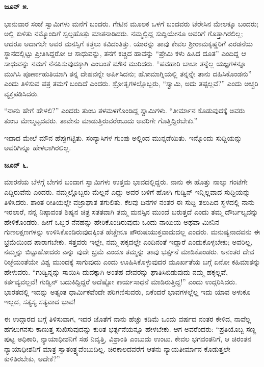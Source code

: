 \textbf{ಜೂನ್ ೫.}

ಭಾನುವಾರ ಸಂಜೆ ಸ್ವಾಮಿಗಳು ಮನೆಗೆ ಬಂದರು. ಗೇಟಿನ ಮೂಲಕ ಒಳಗೆ ಬಂದವರು ಟೆರೇಸಿನ ಮೇಲಕ್ಕೂ ಬಂದರು; ಅಲ್ಲಿ ಕುಳಿತು ನಮ್ಮೊಂದಿಗೆ ಸ್ವಲ್ಪಹೊತ್ತು ಮಾತನಾಡಿದರು. ನಮ್ಮಲ್ಲಿದ್ದ ಸುದ್ದಿಯೇನೂ ಅವರಿಗೆ ಗೊತ್ತಾಗಿರಲಿಲ್ಲ; ಆದರೂ ಅದಾಗಲೇ ಅವರ ಮನಸ್ಸಿಗೆ ಕತ್ತಲು ಕವಿದಂತಿತ್ತು. ಯಾರನ್ನು ತಾವು ಕೇವಲ ಶ‍್ರೀರಾಮಕೃಷ್ಣರಿಗೆ ಎರಡನೆಯ ಸ್ಥಾನದಲ್ಲಿಟ್ಟು ಪ್ರೀತಿಸಿದ್ದರೋ ಆ ಸಾಧುವನ್ನು, ತನಗೆ ಕಚ್ಚಿದ ಹಾವನ್ನು “ಪ್ರೇಮಿ ಕಳು ಹಿಸಿದ ದೂತ” ಎಂದಿದ್ದ ಆ ಸಾಧುವನ್ನು ನಮಗೆ ನೆನಪಿಸುವುದಕ್ಕಾಗಿ ಎಂಬಂತೆ ಮೌನ ಮುರಿದರು. “ಪವಹಾರಿ ಬಾಬಾ ತನ್ನೆಲ್ಲ ಯಜ್ಞಗಳನ್ನೂ ಮುಗಿಸಿ ಪೂರ್ಣಾಹುತಿಯಾಗಿ ತನ್ನ ದೇಹವನ್ನೇ ಅರ್ಪಿಸಿದನು; ಹೋಮಾಗ್ನಿಯಲ್ಲಿ ತನ್ನನ್ನೇ ತಾನು ದಹಿಸಿಕೊಂಡನು” ಎಂದು ತಿಳಿಸುವ ಪತ್ರ ತಮಗೆ ಬಂದಿದೆ ಎಂದರು. ಶ್ರೋತೃಗಳಲ್ಲೊಬ್ಬರು, “ಸ್ವಾಮಿ, ಅದು ತಪ್ಪಲ್ಲವೆ?” ಎಂದು ಅಚ್ಚರಿ ವ್ಯಕ್ತಪಡಿಸಿದರು.

“ನಾನು ಹೇಗೆ ಹೇಳಲಿ?” ಎಂದರು ತುಂಬ ತಳಮಳಗೊಂಡಿದ್ದ ಸ್ವಾಮಿಗಳು. “ತೀರ್ಮಾನ ಕೊಡುವುದಕ್ಕೆ ಅವರು ತುಂಬ ಮೇಲ್ಮಟ್ಟದವರು. ತಾವೇನು ಮಾಡುತ್ತಿರುವರೆಂಬುದು ಅವರಿಗೇ ಗೊತ್ತಿದ್ದಿರಬೇಕು.”

ಇದಾದ ಮೇಲೆ ಮೌನ ಹೆಪ್ಪುಗಟ್ಟಿತು. ಸಂನ್ಯಾಸಿಗಳ ಗುಂಪು ಅಲ್ಲಿಂದ ಮುನ್ನಡೆಯಿತು. ಇನ್ನೊಂದು ಸುದ್ದಿಯನ್ನು ಅವರಿಗಿನ್ನೂ ಹೇಳಲಾಗಿರಲಿಲ್ಲ.

\textbf{ಜೂನ್ ೬.}

ಮಾರನೆಯ ಬೆಳಗ್ಗೆ ಬೇಗನೆ ಬಂದಾಗ ಸ್ವಾಮಿಗಳು ಉತ್ತಮ ಭಾವದಲ್ಲಿದ್ದರು. ನಾನು ಈ ಹೊತ್ತು ನಾಲ್ಕು ಗಂಟೆಗೇ ಎದ್ದಿರುವೆನು ಎಂದರು. ನಮ್ಮಲ್ಲೊಬ್ಬರು ಮೆಲ್ಲನೆ ಎದ್ದು ಅವರ ಬಳಿಗೆ ಹೋಗಿ ಗುಡ್ವಿನ್ ಇನ್ನಿಲ್ಲವಾದ ಸುದ್ದಿಯನ್ನು ತಿಳಿಸಿದರು. ಶಾಂತ ರೀತಿಯಲ್ಲೇ ವಜ್ರಾಘಾತ ತಗುಲಿತು. ಕೆಲವು ದಿನಗಳ ನಂತರ ಈ ಸುದ್ದಿ ತಲುಪಿದ ಸ್ಥಳದಲ್ಲಿ ನಾನು ಇರಲಾರೆ, ನನ್ನ ನಿಷ್ಠಾವಂತ ಶಿಷ್ಯನ ಚಿತ್ರ ಸತತವಾಗಿ ತಮ್ಮ ಮನಸ್ಸಿನ ಮುಂದೆ ಬರುತ್ತದೆ ಎಂದು ತಮ್ಮ ದೌರ್ಬಲ್ಯವನ್ನು ಹೇಳಿಕೊಂಡರು. ಹೀಗೆ ಒಬ್ಬರ ನೆನಹನ್ನು ಹೇರಿಕೊಂಡಿರುವುದು ಒಂದು ನಾಯಿಯ ಅಥವಾ ಮೀನಿನ ಗುಣಲಕ್ಷಣಗಳನ್ನು ಉಳಿಸಿಕೊಂಡಿರುವುದಕ್ಕಿಂತ ಹೆಚ್ಚೇನೂ ಪೌರುಷಯುಕ್ತವಾದುದಲ್ಲ ಎಂದರು. ಮನುಷ್ಯನಾದವನು ಈ ಭ್ರಮೆಯಿಂದ ಪಾರಾಗಬೇಕು. ಸತ್ತವರು ಇಲ್ಲೇ, ನಮ್ಮ ಪಕ್ಕದಲ್ಲೇ ಎಂದಿನಂತೆ ಇದ್ದಾರೆ ಎಂದುಕೊಳ್ಳಬೇಕು; ಅವರಿಲ್ಲ, ನಮ್ಮನ್ನು ಬಿಟ್ಟುಹೋದರು ಎನ್ನು ವುದೇ ಭ್ರಮೆ ಎಂದೂ ತಮ್ಮನ್ನು ತಾವು ಭರ್ತ್ಸನೆ ಮಾಡಿಕೊಂಡರು. ಅನಂತರ ದೇವ ರಿಚ್ಛೆಯಂತೆಯೇ ವಿಶ್ವ ಮುಂದಕ್ಕೆ ಸಾಗುವುದು ಎಂದು ಊಹಿಸಿಕೊಳ್ಳುವುದರ ಮೂರ್ಖತೆಯ ಬಗ್ಗೆ ಏನೋ ಕಹಿಮಾತನ್ನು ಹೇಳುವರು. “ಗುಡ್ವಿನ್ನನ್ನು ಸಾಯಿಸಿ ದುದಕ್ಕಾಗಿ ಅಂತಹ ದೇವರನ್ನು ಘಾತಿಸಿಬಿಡುವುದು ನಮ್ಮ ಹಕ್ಕಲ್ಲವೆ, ಕರ್ತವ್ಯವಲ್ಲವೆ! ಗುಡ್ವಿನ್ ಬದುಕಿದ್ದಿದ್ದರೆ ಅದೆಷ್ಟೋ ಕಾರ್ಯಸಾಧನೆ ಮಾಡಿರುತ್ತಿದ್ದ!” ಎಂದು ಉದ್ಗರಿಸಿದರು. ಭಾರತದಲ್ಲಿ ಇದನ್ನು ಅತ್ಯಂತ ಧಾರ್ಮಿಕವೆಂದೇ ಪರಿಗಣಿಸುವರು, ಏಕೆಂದರೆ ಭಾವಗಳಲ್ಲೆಲ್ಲ ಇದು ಯಾವ ಅಳುಕೂ ಇಲ್ಲದ, ಸತ್ಯಸ್ಯ ಸತ್ಯವಾದ ಭಾವ!

ಈ ಉದ್ಗಾರದ ಬಗ್ಗೆ ತಿಳಿಸುವಾಗ, ಇದರ ಜೊತೆಗೆ ನಾನು ಹೆಚ್ಚು ಕಡಿಮೆ ಒಂದು ವರ್ಷದ ನಂತರ ಕೇಳಿದ, ನಾವೆಲ್ಲ ಹಗಲುಗನಸು ಕಾಣುತ್ತ ಸುಖಿಸುವುದನ್ನು ಕುರಿತ ಭರ್ತ್ಸನೆಯನ್ನೂ ಹೇಳಬೇಕು. ಆಗ ಅವರೆಂದರು: “ಪ್ರತಿಯೊಬ್ಬ ಸಣ್ಣ ಪುಟ್ಟ ಅಧಿಕಾರಿ, ನ್ಯಾಯಾಧೀಶನಿಗೆ ಸಹ ನಿವೃತ್ತಿ, ವಿಶ್ರಾಂತಿ ಎಂಬುದು ಉಂಟು. ಕೇವಲ ಭಗವಂತನಿಗೆ, ಆ ಚಿರಂತನ ನ್ಯಾಯಾಧೀಶನಿಗೆ ಮಾತ್ರ ಸ್ವಾತಂತ್ರ್ಯವೆಂಬುದಿಲ್ಲ. ಚಿರಕಾಲದವರೆಗೆ ಆತನು ನ್ಯಾಯತೀರ್ಮಾನ ಕೊಡುತ್ತಲೇ ಕುಳಿತಿರಬೇಕು, ಅದೇಕೆ?”

